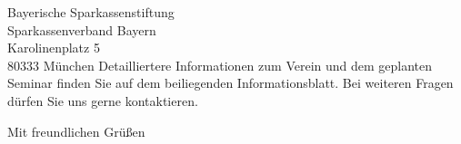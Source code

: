 \documentclass[../style/orpheus,fontsize=11pt]{scrlttr2}
\begin{document}
\begin{letter}{
\noindent Bayerische Sparkassenstiftung \\
Sparkassenverband Bayern\\
Karolinenplatz 5\\
80333 M\"unchen
}
Detailliertere Informationen zum Verein und dem geplanten Seminar finden Sie auf dem beiliegenden Informationsblatt.  Bei weiteren Fragen  d\"urfen Sie uns gerne kontaktieren.




\closing{Mit freundlichen Gr\"u\ss en}


\end{letter}
\end{document}
